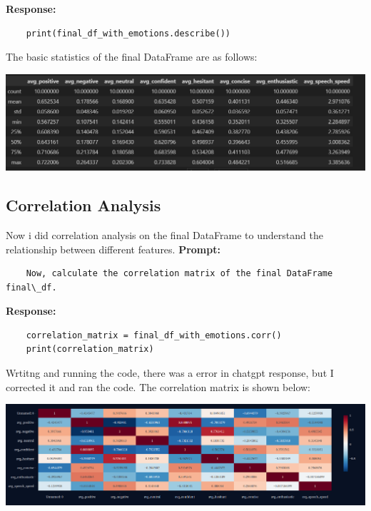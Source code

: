 \documentclass[11pt,a4paper]{article}
\begin{document}
\textbf{Response:}
\begin{tcolorbox}
    \begin{lstlisting}
    print(final_df_with_emotions.describe())
    \end{lstlisting}
\end{tcolorbox}

\large{The basic statistics of the final DataFrame are as follows:}
\begin{center}
    \includegraphics[width=1\columnwidth]{images_prompts/basic-stats.png}
\end{center}


\subsection{Correlation Analysis}
    Now i did correlation analysis on the final DataFrame to understand the relationship between different features.
\textbf{Prompt:}
\begin{tcolorbox}
    \begin{lstlisting}
    Now, calculate the correlation matrix of the final DataFrame final\_df.
\end{lstlisting}
\end{tcolorbox}

\textbf{Response:}
\begin{tcolorbox}
    \begin{lstlisting}
    correlation_matrix = final_df_with_emotions.corr()
    print(correlation_matrix)
    \end{lstlisting}
\end{tcolorbox}

\large{Wrtitng and running the code, there was a error in chatgpt response, but 
I corrected it and ran the code. The correlation matrix is shown below:}

\begin{center}
    \includegraphics[width=1\columnwidth]{images/corr.png}
\end{center}
\end{document}
